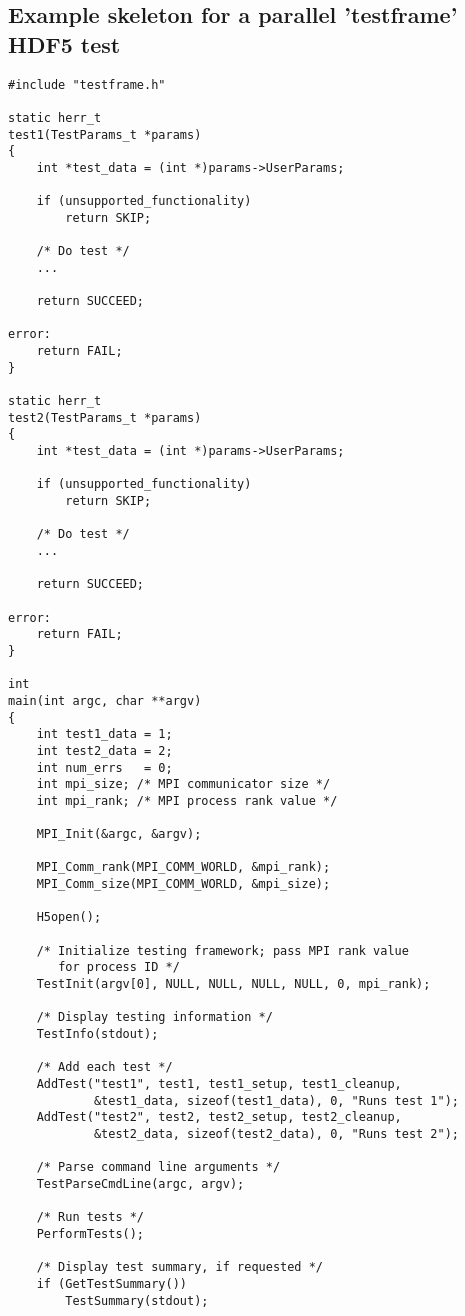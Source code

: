 \documentclass[../HDF5_RFC.tex]{subfiles}
\begin{document}
\subsection{\textbf{Example skeleton for a parallel 'testframe' HDF5 test}}
\label{apdx:testframe_parallel_example}

\begin{verbatim}
#include "testframe.h"

static herr_t
test1(TestParams_t *params)
{
    int *test_data = (int *)params->UserParams;

    if (unsupported_functionality)
        return SKIP;

    /* Do test */
    ...

    return SUCCEED;

error:
    return FAIL;
}

static herr_t
test2(TestParams_t *params)
{
    int *test_data = (int *)params->UserParams;

    if (unsupported_functionality)
        return SKIP;

    /* Do test */
    ...

    return SUCCEED;

error:
    return FAIL;
}

int
main(int argc, char **argv)
{
    int test1_data = 1;
    int test2_data = 2;
    int num_errs   = 0;
    int mpi_size; /* MPI communicator size */
    int mpi_rank; /* MPI process rank value */

    MPI_Init(&argc, &argv);

    MPI_Comm_rank(MPI_COMM_WORLD, &mpi_rank);
    MPI_Comm_size(MPI_COMM_WORLD, &mpi_size);

    H5open();

    /* Initialize testing framework; pass MPI rank value
       for process ID */
    TestInit(argv[0], NULL, NULL, NULL, NULL, 0, mpi_rank);

    /* Display testing information */
    TestInfo(stdout);

    /* Add each test */
    AddTest("test1", test1, test1_setup, test1_cleanup,
            &test1_data, sizeof(test1_data), 0, "Runs test 1");
    AddTest("test2", test2, test2_setup, test2_cleanup,
            &test2_data, sizeof(test2_data), 0, "Runs test 2");

    /* Parse command line arguments */
    TestParseCmdLine(argc, argv);

    /* Run tests */
    PerformTests();

    /* Display test summary, if requested */
    if (GetTestSummary())
        TestSummary(stdout);


\end{verbatim}
\end{document}
